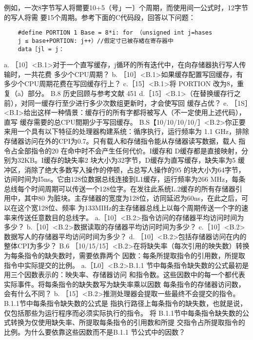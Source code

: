例如，一次8字节写人将爾要10+5（号」一〕个周期，而使用间一公式时，12字节的写人将需
要15个周期。参考下面的C代码段，回答以下问题：
\begin{verbatim}
    #define PORTION 1 Base = 8*i: for （unsigned int j=hases
    j ≤ base+PORTION: j++）//假定寸已被存緒在寄存器中
    data［jl = j：
\end{verbatim}
a. ［10］<B.1>对于一个直写缓存，j循环的所有迭代中，在向存储器执行写人传输时，一共花费
多少个CPU周期？
b. ［10］<B.1>如果缓存配置写回缓存，有多少个CPU周期花费在写回缓存行上？
c.［15］<B.1>将 PORTION 改为8，重复（a）部分。
B.8 历史回顾与参考文献
451
d.［15］<B.1>（在替换缓存行之前），对同一缓存行至少进行多少次数组更新时，才会使写回
缓存占优？
e. ［1S］<B.I>给出这样一种情景：缓存行的所有字都将被写人（不一定使用上述代码），直写
缓存需要的总CPU間期少于写回缓存。
B.S【10/10/10/10/］<B.2>你正要来用一个具有以下特征的处理器构建系统：循序执行，运行频率为
1.1 GHz，排除存储器访问在外的CPI为0.7。只有载人和存储指令能从存储器读写数据，载人
指令占全部指令的20%
在命中时不会产生任何代价。I缓存和 D缓存都是直接映射，分别为32KB。I缓存的缺失率2%
块大小为32字节，D缓存为直写缓存，缺失率为5%
缓冲区，消除了绝大多数写入操作的停顿，占总写人操作的95%
的块大小为64字节，访间时间为I5ns。它由128位数据总线连接到L1缓存，运行频率为266
MHz，每条总线每个时间周期可以传送一个128位字。在发往此系统L.2缓存的所有存储器引
用中，其中80%
为脏块。主存储器的宽度为128位，访同延迟为60ns，在此之后，可以在这个宽128位、频率
为133MIHz的主存储器总线上以每个周期传送一个字的速率来传送任意数目的总线字。
a.［10］<B.2>指令访问的存储器平均访问时间为多少？
b.［10］<B.2>数据读取的存储器平均访问时间为多少？
c.［10］<B.2>数据写人的存储器平均访问时间为多少？
d. ［10］<B.2>包括存储器访问在内的整体CPI为多少？
B.6
［10/15/15］<B.2>在将缺失率（每次引用的映失数）转换为每条指令的缺失数时，需要依靠两个
因数：每条所提取指令的引用数，所提取指令中实际提交的比例。
a.［L0］<B.2>B.1.1 节中每条指令缺失数的公式最初是用三个因数表示的：映失率、存储器访问
和指令数。这些因数中的每一个都代表实际事件。将每条指令的缺失数写为缺失率乘以因数
每条指令的存储器访问数，会有什么不同？
b. ［15］<B.2>推测处理器会提取一些最终不会提交的指令。B.1.1节中每条指令缺失数的公式是
指执行路径上每条指令的缺失数，也就是说，仅包括那些为运行程序而必须实际执行的指令。
将 B.1.1节中每条指令缺失数的公式转换为仅使用缺失率、所提取每条指令的引用数和所提
交指令占所提取指令的比例。为什么要依靠这些因数而不是B.1.1 节公式中的因数？
